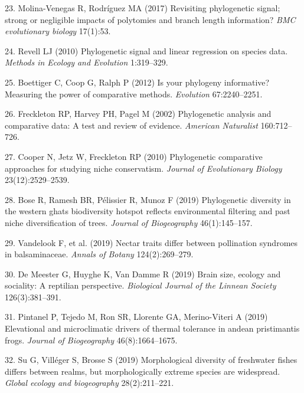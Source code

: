 \documentclass[9pt,twocolumn,twoside,lineno]{pnas-new}
\begin{document}
\leavevmode\hypertarget{ref-MolinaVenegas2017}{}%
23. Molina-Venegas R, Rodríguez MA (2017) Revisiting phylogenetic
signal; strong or negligible impacts of polytomies and branch length
information? \emph{BMC evolutionary biology} 17(1):53.

\leavevmode\hypertarget{ref-Revell2010}{}%
24. Revell LJ (2010) Phylogenetic signal and linear regression on
species data. \emph{Methods in Ecology and Evolution} 1:319--329.

\leavevmode\hypertarget{ref-Boettiger_et_al2012}{}%
25. Boettiger C, Coop G, Ralph P (2012) Is your phylogeny informative?
Measuring the power of comparative methods. \emph{Evolution}
67:2240--2251.

\leavevmode\hypertarget{ref-Freckleton_et_al2002}{}%
26. Freckleton RP, Harvey PH, Pagel M (2002) Phylogenetic analysis and
comparative data: A test and review of evidence. \emph{American
Naturalist} 160:712--726.

\leavevmode\hypertarget{ref-Cooper2010}{}%
27. Cooper N, Jetz W, Freckleton RP (2010) Phylogenetic comparative
approaches for studying niche conservatism. \emph{Journal of
Evolutionary Biology} 23(12):2529--2539.

\leavevmode\hypertarget{ref-Bose2019}{}%
28. Bose R, Ramesh BR, Pélissier R, Munoz F (2019) Phylogenetic
diversity in the western ghats biodiversity hotspot reflects
environmental filtering and past niche diversification of trees.
\emph{Journal of Biogeography} 46(1):145--157.

\leavevmode\hypertarget{ref-Vandelook2019}{}%
29. Vandelook F, et al. (2019) Nectar traits differ between pollination
syndromes in balsaminaceae. \emph{Annals of Botany} 124(2):269--279.

\leavevmode\hypertarget{ref-DeMeester2019}{}%
30. De Meester G, Huyghe K, Van Damme R (2019) Brain size, ecology and
sociality: A reptilian perspective. \emph{Biological Journal of the
Linnean Society} 126(3):381--391.

\leavevmode\hypertarget{ref-Pintanel2019}{}%
31. Pintanel P, Tejedo M, Ron SR, Llorente GA, Merino-Viteri A (2019)
Elevational and microclimatic drivers of thermal tolerance in andean
pristimantis frogs. \emph{Journal of Biogeography} 46(8):1664--1675.

\leavevmode\hypertarget{ref-Su2019}{}%
32. Su G, Villéger S, Brosse S (2019) Morphological diversity of
freshwater fishes differs between realms, but morphologically extreme
species are widespread. \emph{Global ecology and biogeography}
28(2):211--221.
\end{document}
